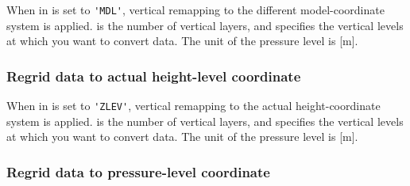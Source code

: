 When  in 
is set to \verb|'MDL'|, vertical remapping to the different model-coordinate system is applied.
 is the number of vertical layers,
and  specifies the vertical levels at which you want to convert data.
The unit of the pressure level is [m].

\subsubsection{Regrid data to actual height-level coordinate}

%

When  in 
is set to \verb|'ZLEV'|, vertical remapping to the actual height-coordinate system is applied.
 is the number of vertical layers,
and  specifies the vertical levels at which you want to convert data.
The unit of the pressure level is [m].

\subsubsection{Regrid data to pressure-level coordinate}


